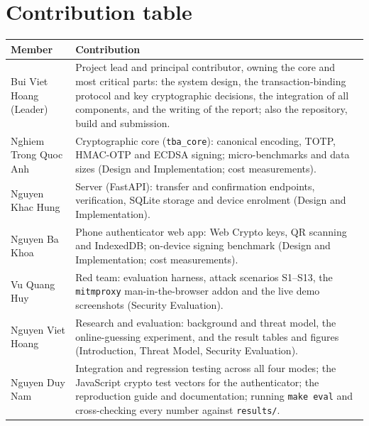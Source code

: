 \section{Contribution table}\label{app:contrib}
\begin{table}[H]
\centering\small
\begin{tabularx}{\linewidth}{@{}lX@{}}
\toprule
Member & Contribution \\
\midrule
Bui Viet Hoang (Leader) & Project lead and principal contributor, owning the core and most critical parts: the system design, the transaction-binding protocol and key cryptographic decisions, the integration of all components, and the writing of the report; also the repository, build and submission. \\
Nghiem Trong Quoc Anh & Cryptographic core (\texttt{tba\_core}): canonical encoding, TOTP, HMAC-OTP and ECDSA signing; micro-benchmarks and data sizes (Design and Implementation; cost measurements). \\
Nguyen Khac Hung & Server (FastAPI): transfer and confirmation endpoints, verification, SQLite storage and device enrolment (Design and Implementation). \\
Nguyen Ba Khoa & Phone authenticator web app: Web Crypto keys, QR scanning and IndexedDB; on-device signing benchmark (Design and Implementation; cost measurements). \\
Vu Quang Huy & Red team: evaluation harness, attack scenarios S1--S13, the \texttt{mitmproxy} man-in-the-browser addon and the live demo screenshots (Security Evaluation). \\
Nguyen Viet Hoang & Research and evaluation: background and threat model, the online-guessing experiment, and the result tables and figures (Introduction, Threat Model, Security Evaluation). \\
Nguyen Duy Nam & Integration and regression testing across all four modes; the JavaScript crypto test vectors for the authenticator; the reproduction guide and documentation; running \texttt{make eval} and cross-checking every number against \texttt{results/}. \\
\bottomrule
\end{tabularx}
\end{table}

